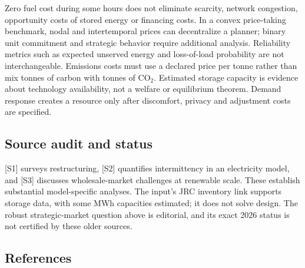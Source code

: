 \documentclass[11pt,a4paper]{article}
\begin{document}
Zero fuel cost during some hours does not eliminate scarcity, network congestion, opportunity costs of stored energy or financing costs. In a convex price-taking benchmark, nodal and intertemporal prices can decentralize a planner; binary unit commitment and strategic behavior require additional analysis. Reliability metrics such as expected unserved energy and loss-of-load probability are not interchangeable. Emissions costs must use a declared price per tonne rather than mix tonnes of carbon with tonnes of $\mathrm{CO}_2$. Estimated storage capacity is evidence about technology availability, not a welfare or equilibrium theorem. Demand response creates a resource only after discomfort, privacy and adjustment costs are specified.

\subsection*{Source audit and status}

[S1] surveys restructuring, [S2] quantifies intermittency in an electricity model, and [S3] discusses wholesale-market challenges at renewable scale. These establish substantial model-specific analyses. The input's JRC inventory link supports storage data, with some MWh capacities estimated; it does not solve design. The robust strategic-market question above is editorial, and its exact 2026 status is not certified by these older sources.

\subsection*{References}
\end{document}
